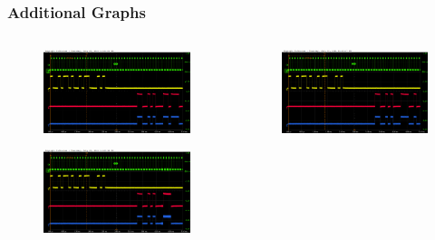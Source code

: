 \documentclass[aspectratio=169]{beamer}
\begin{document}
	\begin{frame}
	\frametitle{Additional Graphs}
	\begin{columns}
		\begin{center}
			\begin{figure}
				\includegraphics[width=0.95 \textwidth]{IMG/probe/09-08-2021_ch05-read55-baselinedac1.png}
				\caption{}
			\end{figure}
			\begin{figure}
				\includegraphics[width=0.95 \textwidth]{IMG/probe/09-08-2021_ch05-read56-baselinedac1.png}
				\caption{}
			\end{figure}		
		\end{center}
		\begin{center}
			\begin{figure}
				\includegraphics[width=0.95 \textwidth]{IMG/probe/09-08-2021_ch05-read57-baselinedac1.png}

\end{figure}
\end{center}
\end{columns}
\end{frame}
\end{document}
